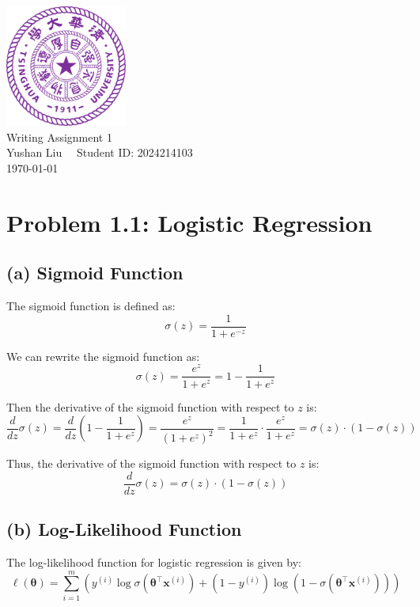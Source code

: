 \documentclass[12pt]{article}
\begin{document}
\begin{titlepage}
    \begin{center}
        \includegraphics[width=4cm]{tsinghua_logo.png}\\[2cm]  %
        {\Huge Writing Assignment 1} \\[2cm]
        {\large Yushan Liu  \ \  Student ID: 2024214103}\\[5cm]
        {\normalsize \today}\\[1cm]
    \end{center}
\end{titlepage}

\section*{Problem 1.1: Logistic Regression}

\subsection*{(a) Sigmoid Function}

The sigmoid function is defined as:
\[
    \sigma(z) = \frac{1}{1 + e^{-z}}
\]

We can rewrite the sigmoid function as:
\[
    \sigma(z) = \frac{e^z}{1 + e^z} = 1 - \frac{1}{1 + e^z}
\]

Then the derivative of the sigmoid function with respect to \( z \) is:
\[
    \frac{d}{dz} \sigma(z) = \frac{d}{dz} \left( 1 - \frac{1}{1 + e^z} \right) = \frac{e^z}{(1 + e^z)^2} = \frac{1}{1 + e^z} \cdot \frac{e^z}{1 + e^z} = \sigma(z) \cdot (1 - \sigma(z))
\]

Thus, the derivative of the sigmoid function with respect to \( z \) is:
\[
    \frac{d}{dz} \sigma(z) = \sigma(z) \cdot (1 - \sigma(z))
\]

\subsection*{(b) Log-Likelihood Function}

The log-likelihood function for logistic regression is given by:
\[
    \ell(\boldsymbol{\theta}) = \sum_{i=1}^{m} \left( y^{(i)} \log \sigma(\boldsymbol{\theta}^\top \boldsymbol{x}^{(i)}) + (1 - y^{(i)}) \log(1 - \sigma(\boldsymbol{\theta}^\top \boldsymbol{x}^{(i)})) \right)
\]
\end{document}
